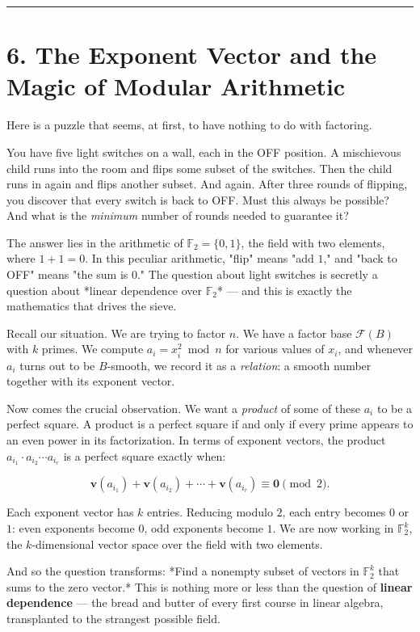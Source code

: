 \documentclass[12pt, letterpaper, openany]{book}
\theoremstyle{definition}
\theoremstyle{remark}
\begin{document}
\bigskip\noindent\rule{\textwidth}{0.4pt}\bigskip



\section*{6. The Exponent Vector and the Magic of Modular Arithmetic}


Here is a puzzle that seems, at first, to have nothing to do with factoring.

You have five light switches on a wall, each in the OFF position. A mischievous child runs into the room and flips some subset of the switches. Then the child runs in again and flips another subset. And again. After three rounds of flipping, you discover that every switch is back to OFF. Must this always be possible? And what is the \textit{minimum} number of rounds needed to guarantee it?

The answer lies in the arithmetic of $\mathbb{F}_2 = \{0, 1\}$, the field with two elements, where $1 + 1 = 0$. In this peculiar arithmetic, "flip" means "add $1$," and "back to OFF" means "the sum is $0$." The question about light switches is secretly a question about *linear dependence over $\mathbb{F}_2$* --- and this is exactly the mathematics that drives the sieve.

Recall our situation. We are trying to factor $n$. We have a factor base $\mathcal{F}(B)$ with $k$ primes. We compute $a_i = x_i^2 \bmod n$ for various values of $x_i$, and whenever $a_i$ turns out to be $B$-smooth, we record it as a \textit{relation}: a smooth number together with its exponent vector.

Now comes the crucial observation. We want a \textit{product} of some of these $a_i$ to be a perfect square. A product is a perfect square if and only if every prime appears to an even power in its factorization. In terms of exponent vectors, the product $a_{i_1} \cdot a_{i_2} \cdots a_{i_r}$ is a perfect square exactly when:

\[
\mathbf{v}(a_{i_1}) + \mathbf{v}(a_{i_2}) + \cdots + \mathbf{v}(a_{i_r}) \equiv \mathbf{0} \pmod{2}.
\]

Each exponent vector has $k$ entries. Reducing modulo $2$, each entry becomes $0$ or $1$: even exponents become $0$, odd exponents become $1$. We are now working in $\mathbb{F}_2^k$, the $k$-dimensional vector space over the field with two elements.

And so the question transforms: *Find a nonempty subset of vectors in $\mathbb{F}_2^k$ that sums to the zero vector.* This is nothing more or less than the question of \textbf{linear dependence} --- the bread and butter of every first course in linear algebra, transplanted to the strangest possible field.
\end{document}
